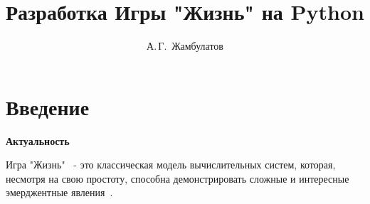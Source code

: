 \documentclass[14pt, oneside]{altsu-report}
\title{Разработка Игры "Жизнь" на Python}
\author{А.\,Г.~Жамбулатов}
\institute{Институт цифровых технологий, электроники и физики}
\date{\the\year}
\begin{document}
\maketitle

\setcounter{page}{2}
\makeabstract
\tableofcontents

\chapter*{Введение}

\textbf{Актуальность}

Игра "Жизнь"~\cite{p1} - это классическая модель вычислительных систем, которая, несмотря на свою простоту, способна демонстрировать сложные и интересные эмерджентные явления~\cite{p2}. 
\end{document}
